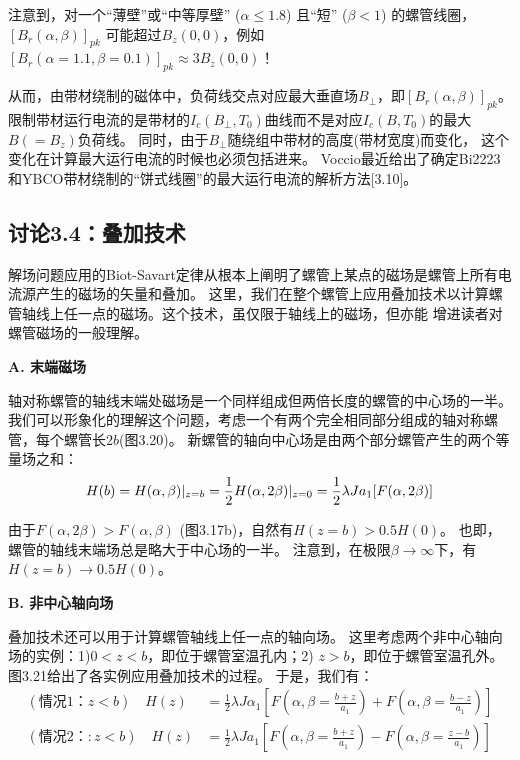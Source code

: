 注意到，对一个“薄壁”或“中等厚壁” ($\alpha \le 1.8$) 且“短” ($\beta < 1$) 的螺管线圈，
$[B_r(\alpha,\beta)]_{pk}$ 可能超过$B_z(0, 0)$，例如$[B_r(\alpha=1.1,\beta=0.1)]_{pk}\approx 3B_z(0,0)$！

从而，由带材绕制的磁体中，负荷线交点对应最大垂直场$B_{\perp}$，即$[B_r(\alpha,\beta)]_{pk}$。
限制带材运行电流的是带材的$I_c(B_{\perp},T_0)$曲线而不是对应$I_c(B, T_0)$的最大$B(=B_z)$负荷线。
同时，由于$B_{\perp}$随绕组中带材的高度(带材宽度)而变化，
这个变化在计算最大运行电流的时候也必须包括进来。
Voccio最近给出了确定Bi2223和YBCO带材绕制的“饼式线圈”的最大运行电流的解析方法[3.10]。



\subsection{讨论3.4：叠加技术}
解场问题应用的Biot-Savart定律从根本上阐明了螺管上某点的磁场是螺管上所有电流源产生的磁场的矢量和叠加。
这里，我们在整个螺管上应用叠加技术以计算螺管轴线上任一点的磁场。这个技术，虽仅限于轴线上的磁场，但亦能
增进读者对螺管磁场的一般理解。

\textbf{A. 末端磁场}

轴对称螺管的轴线末端处磁场是一个同样组成但两倍长度的螺管的中心场的一半。
我们可以形象化的理解这个问题，考虑一个有两个完全相同部分组成的轴对称螺管，每个螺管长$2b$(图3.20)。
新螺管的轴向中心场是由两个部分螺管产生的两个等量场之和：
\begin{equation}
H(b)=H(\alpha,\beta)|_{z=b}=\frac{1}{2}H(\alpha,2\beta)|_{z=0}=\frac{1}{2}\lambda Ja_{1}[F(\alpha,2\beta)]\\%
\end{equation}

由于$F(\alpha, 2\beta)>F(\alpha,\beta)$ (图3.17b)，自然有$H(z=b)>0.5H(0)$。
也即，螺管的轴线末端场总是略大于中心场的一半。
注意到，在极限$\beta\rightarrow\infty$下，有$H(z=b)\rightarrow 0.5H(0)$。

\textbf{B. 非中心轴向场}

叠加技术还可以用于计算螺管轴线上任一点的轴向场。
这里考虑两个非中心轴向场的实例：1)$0<z<b$，即位于螺管室温孔内；2) $z > b$，即位于螺管室温孔外。
图3.21给出了各实例应用叠加技术的过程。
于是，我们有：
\begin{subequations}
	\begin{align}
(\mbox{情况1：}z<b)\quad H(z)&=\frac{1}{2}\lambda J\alpha_{1}[F(\alpha,\beta=\frac{b+z}{a_{1}})+F(\alpha,\beta=\frac{b-z}{a_{1}})]\\%
(\mbox{情况2：}:z<b)\quad H(z)&=\frac{1}{2}\lambda Ja_{1}[F(\alpha,\beta=\frac{b+z}{a_{1}})-F(\alpha,\beta=\frac{z-b}{a_{1}})]%
	\end{align}
\end{subequations}

